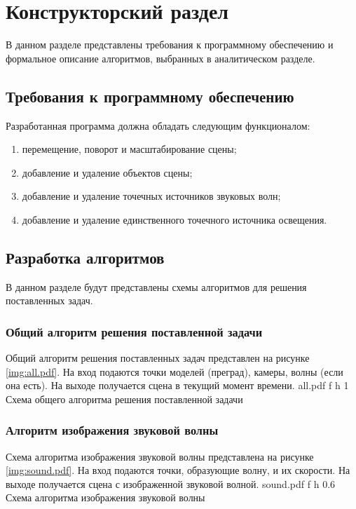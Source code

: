 \chapter{Конструкторский раздел}

В данном разделе представлены требования к программному обеспечению и формальное описание алгоритмов, выбранных в аналитическом разделе.

\section{Требования к программному обеспечению}

Разработанная программа должна обладать следующим функционалом:
\begin{enumerate}
	\item перемещение, поворот и масштабирование сцены;
	\item добавление и удаление объектов сцены;
	\item добавление и удаление точечных источников звуковых волн;
	\item добавление и удаление единственного точечного источника освещения.
\end{enumerate}

\section{Разработка алгоритмов}

В данном разделе будут представлены схемы алгоритмов для решения поставленных задач.

\subsection{Общий алгоритм решения поставленной задачи}

Общий алгоритм решения поставленных задач представлен на рисунке \ref{img:all.pdf}. 
На вход подаются точки моделей (преград), камеры, волны (если она есть).
На выходе получается сцена в текущий момент времени.
	{all.pdf}
	{f}
	{h}
	{1\textwidth}
	{Схема общего алгоритма решения поставленной задачи}
	
\clearpage
	
\subsection{Алгоритм изображения звуковой волны}

Схема алгоритма изображения звуковой волны представлена на рисунке \ref{img:sound.pdf}.
На вход подаются точки, образующие волну, и их скорости.
На выходе получается сцена с изображенной звуковой волной.
	{sound.pdf}
	{f}
	{h}
	{0.6\textwidth}
	{Схема алгоритма изображения звуковой волны}
	
